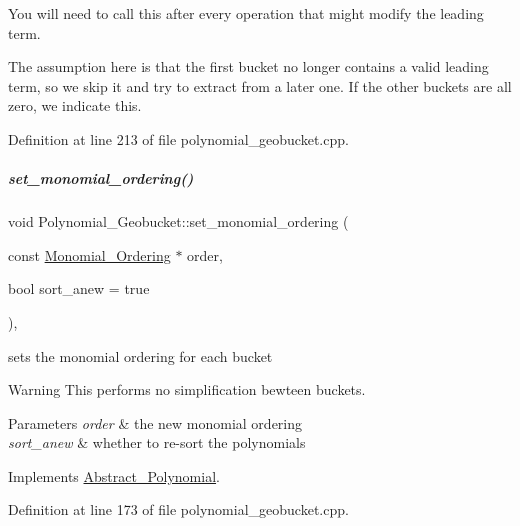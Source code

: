 You will need to call this after every operation that might modify the leading term. 

The assumption here is that the first bucket no longer contains a valid leading term, so we skip it and try to extract from a later one. If the other buckets are all zero, we indicate this. 

Definition at line 213 of file polynomial\+\_\+geobucket.\+cpp.

\mbox{\label{group__polygroup_ad3298b3201f53d0ddaa657206c140ca8}} 
\subparagraph{\texorpdfstring{set\+\_\+monomial\+\_\+ordering()}{set\_monomial\_ordering()}}
{\footnotesize\ttfamily void Polynomial\+\_\+\+Geobucket\+::set\+\_\+monomial\+\_\+ordering (\begin{DoxyParamCaption}\item[{const \hyperlink{group__orderinggroup_class_monomial___ordering}{Monomial\+\_\+\+Ordering} $\ast$}]{order,  }\item[{bool}]{sort\+\_\+anew = {\ttfamily true} }\end{DoxyParamCaption})\hspace{0.3cm}{\ttfamily [override]}, {\ttfamily [virtual]}}



sets the monomial ordering for each bucket 

\begin{DoxyWarning}{Warning}
This performs no simplification bewteen buckets. 
\end{DoxyWarning}

\begin{DoxyParams}{Parameters}
{\em order} & the new monomial ordering \\
\hline
{\em sort\+\_\+anew} & whether to re-\/sort the polynomials \\
\hline
\end{DoxyParams}


Implements \hyperlink{group__polygroup_a12e023570eb675343c4b7ed635a031dc}{Abstract\+\_\+\+Polynomial}.



Definition at line 173 of file polynomial\+\_\+geobucket.\+cpp.


